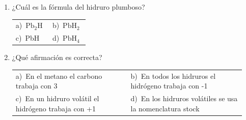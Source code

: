 \documentclass[11pt,a4paper]{article}
\begin{document}
\begin{enumerate}[label=\textbf{\arabic*.},leftmargin=*,itemsep=11pt,topsep=0pt]
\item \begin{minipage}[t]{\linewidth}
¿Cuál es la fórmula del hidruro plumboso?

\vspace{5pt}
\begin{tabular}{@{}p{0.47\linewidth}p{0.47\linewidth}@{}}
a)~$\mathrm{Pb_{2}H}$ & b)~$\mathrm{PbH_{2}}$ \\
c)~PbH & d)~$\mathrm{PbH_{4}}$ \\
\end{tabular}
\end{minipage}

\item \begin{minipage}[t]{\linewidth}
¿Qué afirmación es correcta?

\vspace{5pt}
\begin{tabular}{@{}p{0.47\linewidth}p{0.47\linewidth}@{}}
a)~En el metano el carbono trabaja con 3 & b)~En todos los hidruros el hidrógeno trabaja con -1 \\
c)~En un hidruro volátil el hidrógeno trabaja con +1 & d)~En los hidruros volátiles se usa la nomenclatura stock \\
\end{tabular}
\end{minipage}

\end{enumerate}
\end{document}
